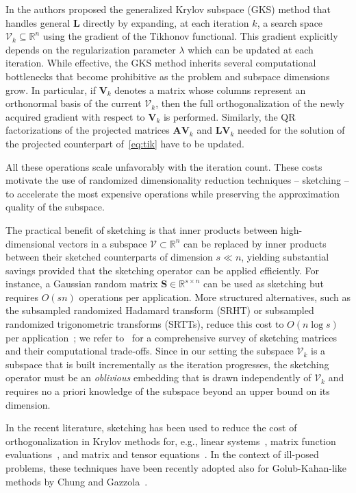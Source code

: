 \documentclass[%
  a4paper,
  onecolumn,
  colorlinks,
]{preprint}
\theoremstyle{plain}
\theoremstyle{definition}
\newcommand{\R}{\ensuremath{\mathbb{R}}}
\newcommand{\bA}{\ensuremath{\boldsymbol{A}}}
\newcommand{\bL}{\ensuremath{\boldsymbol{L}}}
\newcommand{\bS}{\ensuremath{\boldsymbol{S}}}
\newcommand{\bV}{\ensuremath{\boldsymbol{V}}}
\begin{document}
In \cite{LRV12} the authors proposed the
generalized Krylov subspace (GKS) method that handles general $\bL$ directly
by expanding, at each iteration $k$, a search space $\mathcal V_k \subseteq \R^n$ using the gradient of the Tikhonov
functional.
This gradient explicitly depends on the regularization parameter $\lambda$ which can be updated at each iteration.
While effective, the GKS method inherits several computational bottlenecks
that become prohibitive as the problem and subspace dimensions grow.
In particular, if $\bV_k$ denotes a matrix whose columns represent an orthonormal basis of the current
$\mathcal V_k$, then the full orthogonalization of the newly acquired gradient with respect to $\bV_k$ is performed. Similarly, the
QR factorizations of the projected matrices $\bA\bV_k$ and $\bL\bV_k$ needed for the solution of the projected counterpart of~\eqref{eq:tik} have to be updated.

All these operations scale unfavorably with the
iteration count.
These costs motivate the use of randomized dimensionality reduction
techniques -- sketching -- to accelerate the most expensive operations
while preserving the approximation quality of the subspace.

The practical benefit of sketching is that inner products between
high-dimensional vectors in a subspace $\mathcal{V}\subset\R^n$ can be
replaced by inner products between their sketched counterparts of
dimension $s \ll n$, yielding substantial savings provided that the
sketching operator can be applied efficiently.
For instance, a Gaussian random matrix $\bS \in \R^{s \times n}$ can be used as sketching but requires $O(sn)$ operations per application.
More structured alternatives, such as the subsampled randomized
Hadamard transform (SRHT) or subsampled randomized trigonometric
transforms (SRTTs), reduce this cost to $O(n \log s)$ per
application~\cite{WOOLFEetal2008}; we refer to~\cite{Woodruff14} for a comprehensive
survey of sketching matrices and their computational trade-offs.
Since in our setting the subspace $\mathcal{V}_k$ is a subspace
that is built incrementally as the iteration progresses, the sketching
operator must be an \emph{oblivious} embedding that is drawn
independently of $\mathcal{V}_k$ and requires no a priori knowledge of
the subspace beyond an upper bound on its dimension.

In the recent literature, sketching has been used to reduce the cost of orthogonalization in Krylov methods for, e.g., linear systems~\cite{NakatsukasaTropp2024,BalabanovGrigori22}, matrix function evaluations~\cite{GuettelSchweitzer2022,Palittaetal2025}, and matrix and tensor equations~\cite{Palittaetal2025_bis,Buccietal2025}.
In the context of ill-posed problems, these techniques have been recently adopted also
 for Golub-Kahan-like methods by Chung and
Gazzola~\cite{ChungGazzola25}.
\end{document}
